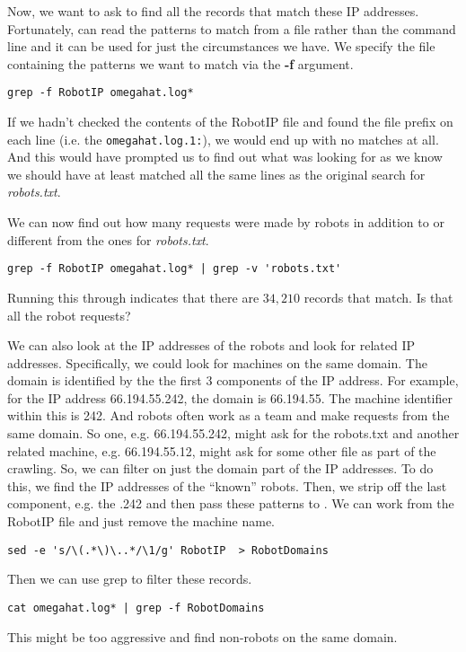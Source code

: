 \begin{enumerate}
Now, we want to ask  to find all the records that match these
IP addresses.
Fortunately,  can read the patterns to match 
from a file rather than the command line and it can be used
for just the circumstances we have.
We specify the file containing the patterns we want to match
via the \textbf{-f} argument.
\begin{verbatim}
grep -f RobotIP omegahat.log*
\end{verbatim}
If we hadn't checked the contents of the RobotIP file and found the file prefix on each line (i.e.
the \texttt{omegahat.log.1:}), we would end up with no matches at all. And this would have prompted
us to find out what  was looking for as we know we should have at least matched all
the same lines as the original search for \textsl{robots.txt}.

We can now find out how many requests were made by robots in addition
to 
or different from the
ones for \textsl{robots.txt}.
\begin{verbatim}
grep -f RobotIP omegahat.log* | grep -v 'robots.txt'
\end{verbatim}
Running this through  indicates that there are $34,210$
records that match.
Is that all the robot requests?

We can also look at the IP addresses of the robots and look for
related IP addresses.  Specifically, we could look for machines on the
same domain. The domain is identified by the the first 3 components of
the IP address.  For example, for the IP address 66.194.55.242, the
domain is 66.194.55. The machine identifier within this is 242.  And
robots often work as a team and make requests from the same domain.
So one, e.g. 66.194.55.242, might ask for the robots.txt and another
related machine, e.g. 66.194.55.12, might ask for some other file as
part of the crawling.  So, we can filter on just the domain part of
the IP addresses.  To do this, we find the IP addresses of the
``known'' robots.  Then, we strip off the last component, e.g. the
.242 and then pass these patterns to .  We can work
from the RobotIP file and just remove the machine name.
\begin{verbatim}
sed -e 's/\(.*\)\..*/\1/g' RobotIP  > RobotDomains
\end{verbatim}
Then we can use grep to filter these records.
\begin{verbatim}
cat omegahat.log* | grep -f RobotDomains 
\end{verbatim}
This might be too aggressive and find non-robots 
on the same domain.


\end{enumerate}
